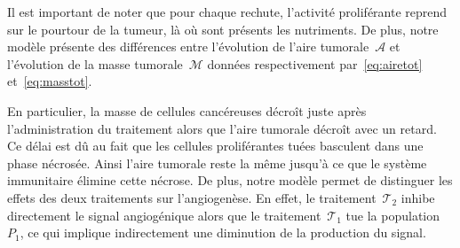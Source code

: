 \documentclass[11pt]{amsart}
\numberwithin{equation}{section}
\newcommand{\TI}{{\mathcal T_1}}
\newcommand{\TS}{{\mathcal T_2}}
\begin{document}
Il est important de noter que pour chaque rechute, l'activité proliférante reprend sur le pourtour de la tumeur, là où sont présents les nutriments. 
De plus, notre modèle présente des différences entre l'évolution de l'aire tumorale~$\mathcal{A}$ et l'évolution de la masse tumorale~$\mathcal{M}$ données respectivement par~\eqref{eq:airetot} et~\eqref{eq:masstot}. 

En particulier, la masse de cellules cancéreuses décroît juste après l'administration du traitement alors que l'aire tumorale décroît avec un retard. 
Ce délai est dû au fait que les cellules proliférantes tuées basculent dans une phase nécrosée. Ainsi l'aire tumorale reste la même jusqu'à ce que le système immunitaire élimine cette nécrose. 
De plus, notre modèle permet de distinguer les effets des deux traitements sur l'angiogenèse. 
En effet, le traitement~$\TS$ inhibe directement le signal angiogénique alors que le  traitement~$\TI$ tue la population~$P_1$, ce qui implique indirectement une diminution de la production du signal.
\end{document}
